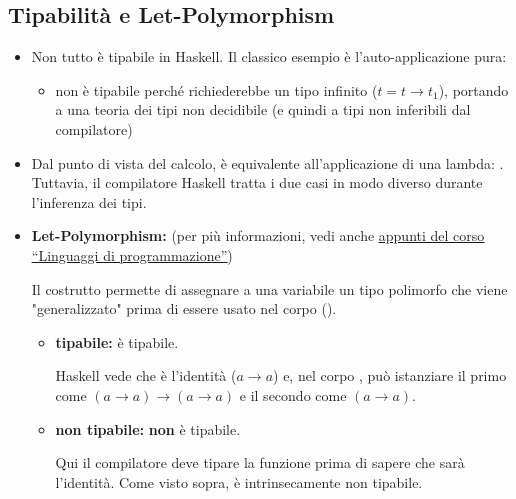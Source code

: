 \subsection{Tipabilità e Let-Polymorphism}
\begin{itemize}
    \item Non tutto è tipabile in Haskell. Il classico esempio è l'auto-applicazione pura:
    \begin{itemize}
        \item {} non è tipabile perché richiederebbe un tipo infinito ($t = t \to t_1$), portando a una teoria dei tipi non decidibile (e quindi a tipi non inferibili dal compilatore)
    \end{itemize}
    
    \item Dal punto di vista del calcolo,  è equivalente all'applicazione di una lambda: . Tuttavia, il compilatore Haskell tratta i due casi in modo diverso durante l'inferenza dei tipi.

    \item \textbf{Let-Polymorphism:}
        \subitem (per più informazioni, vedi anche \href{https://raw.githubusercontent.com/AglaiaNorza/notes-ig/main/terzo%20anno/linguaggi%20di%20programmazione.pdf}{\underline{appunti del corso ``Linguaggi di programmazione''}})

    Il costrutto  permette di assegnare a una variabile un tipo polimorfo che viene "generalizzato" prima di essere usato nel corpo ().
    \begin{itemize}
        \item \textbf{tipabile:}  è tipabile.

            Haskell vede che  è l'identità ($a \to a$) e, nel corpo , può istanziare il primo  come $(a \to a) \to (a \to a)$ e il secondo come $(a \to a)$.
        \item \textbf{non tipabile:}  \textbf{non} è tipabile. 

            Qui il compilatore deve tipare la funzione  prima di sapere che  sarà l'identità. Come visto sopra,  è intrinsecamente non tipabile.
    \end{itemize}

\end{itemize}

